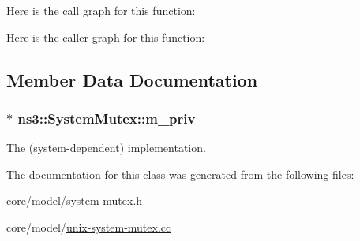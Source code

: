 Here is the call graph for this function\+:




Here is the caller graph for this function\+:




\subsection{Member Data Documentation}
\subsubsection[{\texorpdfstring{m\+\_\+priv}{m_priv}}]{$\ast$ ns3\+::\+System\+Mutex\+::m\+\_\+priv\hspace{0.3cm}{\ttfamily [private]}}\hypertarget{classns3_1_1SystemMutex_a1c11198da714f582c6540f0dd9385650}{}\label{classns3_1_1SystemMutex_a1c11198da714f582c6540f0dd9385650}
The (system-\/dependent) implementation. 

The documentation for this class was generated from the following files\+:\begin{DoxyCompactItemize}
\item 
core/model/\hyperlink{system-mutex_8h}{system-\/mutex.\+h}\item 
core/model/\hyperlink{unix-system-mutex_8cc}{unix-\/system-\/mutex.\+cc}\end{DoxyCompactItemize}

